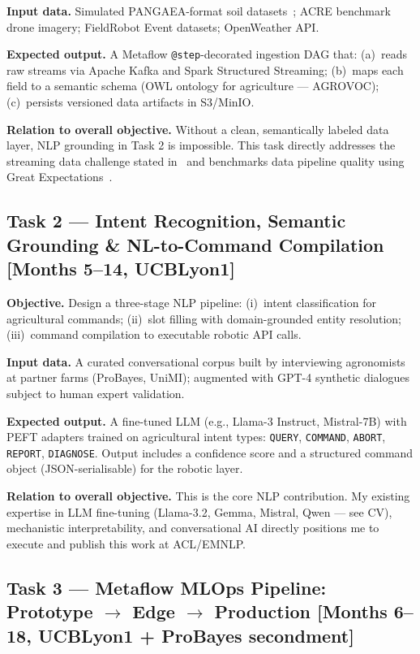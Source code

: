 \documentclass[11pt,a4paper]{article}
\begin{document}
\textbf{Input data.}
Simulated PANGAEA-format soil datasets~\cite{kamilaris_2017}; ACRE benchmark drone imagery;
FieldRobot Event datasets; OpenWeather API.

\textbf{Expected output.}
A Metaflow \texttt{@step}-decorated ingestion DAG that: (a)~reads raw streams via Apache Kafka
and Spark Structured Streaming; (b)~maps each field to a semantic schema (OWL ontology for
agriculture — AGROVOC); (c)~persists versioned data artifacts in S3/MinIO.

\textbf{Relation to overall objective.}
Without a clean, semantically labeled data layer, NLP grounding in Task 2 is impossible.
This task directly addresses the streaming data challenge stated in~\cite{phd_adv_2026} and
benchmarks data pipeline quality using Great Expectations~\cite{tagliabue_metaflow_2023}.

\subsection{Task 2 — Intent Recognition, Semantic Grounding \& NL-to-Command Compilation
  \textnormal{[Months 5--14, UCBLyon1]}}

\textbf{Objective.}
Design a three-stage NLP pipeline: (i)~intent classification for agricultural commands;
(ii)~slot filling with domain-grounded entity resolution; (iii)~command compilation to
executable robotic API calls.

\textbf{Input data.}
A curated conversational corpus built by interviewing agronomists at partner farms (ProBayes, UniMI);
augmented with GPT-4 synthetic dialogues subject to human expert validation.

\textbf{Expected output.}
A fine-tuned LLM (e.g., Llama-3 Instruct, Mistral-7B) with PEFT adapters trained on
agricultural intent types: \texttt{QUERY}, \texttt{COMMAND}, \texttt{ABORT}, \texttt{REPORT},
\texttt{DIAGNOSE}. Output includes a confidence score and a structured command object
(JSON-serialisable) for the robotic layer.

\textbf{Relation to overall objective.}
This is the core NLP contribution. My existing expertise in LLM fine-tuning
(Llama-3.2, Gemma, Mistral, Qwen — see CV), mechanistic interpretability,
and conversational AI directly positions me to execute and publish this work at ACL/EMNLP.

\subsection{Task 3 — Metaflow MLOps Pipeline: Prototype $\to$ Edge $\to$ Production
  \textnormal{[Months 6--18, UCBLyon1 + ProBayes secondment]}}
\end{document}
